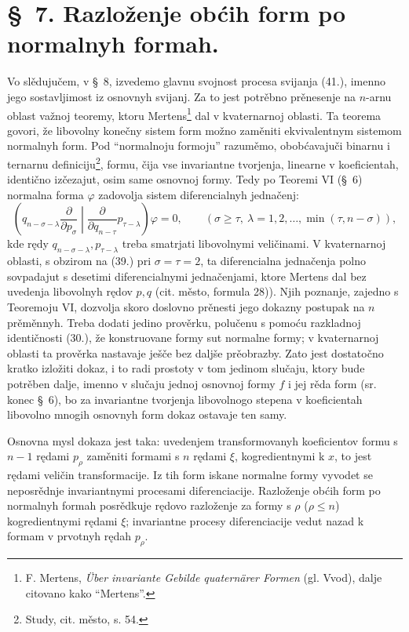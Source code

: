 \documentclass[11pt]{article}
\begin{document}
\section*{\S\ 7. Razloženje obćih form po normalnyh formah.}

Vo slědujučem, v \S\ 8, izvedemo glavnu svojnost procesa svijanja (41.), imenno jego sostavljimost iz osnovnyh svijanj. Za to jest potrěbno prěnesenje na $n$-arnu oblast važnoj teoremy, ktoru Mertens\footnote{F. Mertens, \emph{\"Uber invariante Gebilde quatern\"arer Formen} (gl. Vvod), dalje citovano kako ``Mertens''.} dal v kvaternarnoj oblasti. Ta teorema govori, že libovolny konečny sistem form možno zaměniti ekvivalentnym sistemom normalnyh form. Pod ``normalnoju formoju'' razuměmo, obobćavajuči binarnu i ternarnu definiciju\footnote{Study, cit. město, s. 54.}, formu, čija vse invariantne tvorjenja, linearne v koeficientah, identično izčezajut, osim same osnovnoj formy. Tedy po Teoremi VI (\S\ 6) normalna forma $\varphi$ zadovolja sistem diferencialnyh jednačenj:
\begin{equation}
 \left(q_{n-\sigma-\lambda}\frac{\partial}{\partial p_\sigma}\middle|\frac{\partial}{\partial q_{n-\tau}}p_{\tau-\lambda}\right)\varphi=0,
 \qquad(\sigma\ge\tau,\ \lambda=1,2,\ldots,\min(\tau,n-\sigma)),
\tag{46}
\end{equation}
kde rędy $q_{n-\sigma-\lambda},p_{\tau-\lambda}$ treba smatrjati libovolnymi veličinami. V kvaternarnoj oblasti, s obzirom na (39.) pri $\sigma=\tau=2$, ta diferencialna jednačenja polno sovpadajut s desetimi diferencialnymi jednačenjami, ktore Mertens dal bez uvedenja libovolnyh rędov $p,q$ (cit. město, formula 28)). Njih poznanje, zajedno s Teoremoju VI, dozvolja skoro doslovno prěnesti jego dokazny postupak na $n$ prěměnnyh. Treba dodati jedino prověrku, polučenu s pomoću razkladnoj identičnosti (30.), že konstruovane formy sut normalne formy; v kvaternarnoj oblasti ta prověrka nastavaje ješče bez daljše prěobrazby. Zato jest dostatočno kratko izložiti dokaz, i to radi prostoty v tom jedinom slučaju, ktory bude potrěben dalje, imenno v slučaju jednoj osnovnoj formy $f$ i jej rěda form (sr. konec \S\ 6), bo za invariantne tvorjenja libovolnogo stepena v koeficientah libovolno mnogih osnovnyh form dokaz ostavaje ten samy.

Osnovna mysl dokaza jest taka: uvedenjem transformovanyh koeficientov formu s $n-1$ rędami $p_\rho$ zaměniti formami s $n$ rędami $\xi$, kogredientnymi k $x$, to jest rędami veličin transformacije. Iz tih form iskane normalne formy vyvodet se neposrědnje invariantnymi procesami diferenciacije. Razloženje obćih form po normalnyh formah posrědkuje rędovo razloženje za formy s $\rho$ ($\rho\le n$) kogredientnymi rędami $\xi$; invariantne procesy diferenciacije vedut nazad k formam v prvotnyh rędah $p_\rho$.
\end{document}
